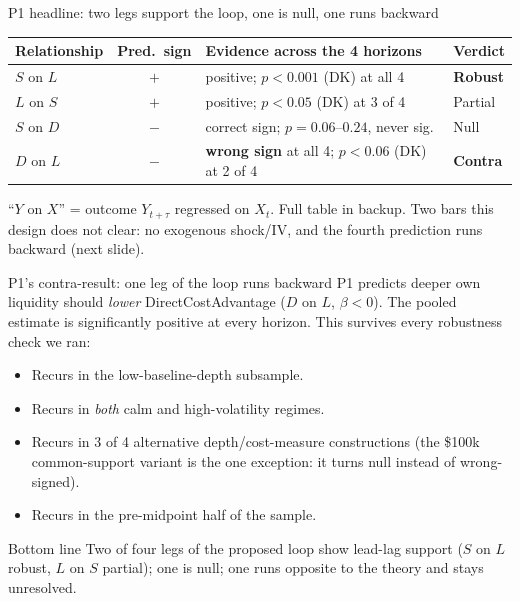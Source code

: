 \documentclass[aspectratio=169]{beamer}
\begin{document}
\begin{frame}{P1 headline: two legs support the loop, one is null, one runs backward}
  \small
  \begin{center}
  \begin{tabular}{@{}p{3.6cm}c p{5.1cm} l@{}}
    \toprule
    Relationship & Pred.\ sign & Evidence across the 4 horizons & Verdict \\
    \midrule
    $S$ on $L$ & $+$ & positive; $p<0.001$ (DK) at all 4 & \textbf{Robust} \\
    $L$ on $S$ & $+$ & positive; $p<0.05$ (DK) at 3 of 4 & Partial \\
    $S$ on $D$ & $-$ & correct sign; $p=0.06$--$0.24$, never sig. & Null \\
    $D$ on $L$ & $-$ & \textbf{wrong sign} at all 4; $p<0.06$ (DK) at 2 of 4 & \textbf{Contra} \\
    \bottomrule
  \end{tabular}
  \end{center}
  \vspace{0.6em}
  {\footnotesize ``$Y$ on $X$'' = outcome $Y_{t+\tau}$ regressed on $X_t$. Full table in backup. Two bars this design does not clear: no exogenous shock/IV, and the fourth prediction runs backward (next slide).}
\end{frame}

\begin{frame}{P1's contra-result: one leg of the loop runs backward}
  P1 predicts deeper own liquidity should \emph{lower} DirectCostAdvantage ($D$ on $L$, $\beta<0$). The pooled estimate is significantly positive at every horizon. This survives every robustness check we ran:
  \begin{itemize}
    \item Recurs in the low-baseline-depth subsample.
    \item Recurs in \emph{both} calm and high-volatility regimes.
    \item Recurs in 3 of 4 alternative depth/cost-measure constructions (the \$100k common-support variant is the one exception: it turns null instead of wrong-signed).
    \item Recurs in the pre-midpoint half of the sample.
  \end{itemize}
  \vspace{0.6em}
  \begin{alertblock}{Bottom line}
    Two of four legs of the proposed loop show lead-lag support ($S$ on $L$ robust, $L$ on $S$ partial); one is null; one runs opposite to the theory and stays unresolved.
  \end{alertblock}
\end{frame}
\end{document}
